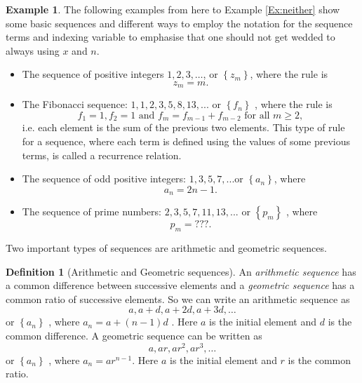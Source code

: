 \documentclass[extrafontsizes, twoside, a4paper]{memoir}
\theoremstyle{plain}%
\theoremstyle{definition}
\newtheorem{defn}{Definition}[chapter]
\newtheorem{exmp}{Example}[chapter]
\theoremstyle{remark}
\begin{document}
\begin{exmp}
The following examples from here to Example \ref{Ex:neither} show some basic sequences and different ways to employ the notation for the sequence terms and indexing variable to emphasise that one should not get wedded to always using $x$ and $n$.

\begin{itemize}
\item
The sequence of positive integers $1,2,3, \dots $, or $\left \{ z_m \right \}$, where the rule is
$$z_m = m . $$
\item
The Fibonacci sequence: $1, 1, 2, 3, 5, 8, 13, ...$ or $\left \{f_n \right \}$ , where the rule is
$$f_1 = 1, f_2 = 1 \text{ and } f_m = f_{m-1}+f_{m-2} \text{ for all } m \geq 2, $$  i.e. each element is the sum of the
previous two elements. This type of rule for a sequence, where each term is
defined using the values of some previous terms, is called a recurrence relation.
\item
The sequence of odd positive integers: $1, 3, 5, 7, ... $or $\left \{a_n\right \}$, where $$a_n = 2n-1.$$
\item
The sequence of prime numbers: $2, 3, 5, 7, 11, 13, ... $ or $\left \{ p_m \right \}$ , where $$p_m = ???.$$
\end{itemize}
\end{exmp}
Two important types of sequences are arithmetic and geometric sequences.
\begin{defn}[Arithmetic and Geometric sequences]
An \emph{arithmetic
sequence} has a common difference between successive elements and a \emph{geometric
sequence} has a common ratio of successive elements. So we can write an arithmetic
sequence as
$$a, a + d , a + 2d , a + 3d ,\dots $$
 or $\left \{ a_n\right \}$ , where $a_n = a + (n - 1)d$ .
Here $a$ is the initial element and $d$ is the common difference. A geometric sequence can
be written as
$$a, ar , ar^2 , ar^3 ,\dots $$
 or $\left \{ a_n \right \}$ , where $a_n = ar^{n-1}$.
Here $a$ is the initial element and $r$ is the common ratio.
\end{defn}
\end{document}
